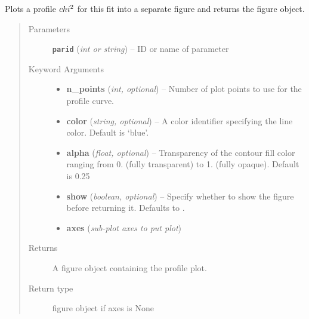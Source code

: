 \documentclass[a4paper,10pt,english]{sphinxmanual}
\begin{document}
\begin{fulllineitems}
\begin{fulllineitems}
\end{fulllineitems}


\begin{fulllineitems}
\label{index:kafe.fit.Fit.plot_profile}
Plots a profile \(\\chi^2\) for this fit into
a separate figure and returns the figure object.
\begin{quote}\begin{description}
\item[{Parameters}] \leavevmode
\textbf{\texttt{parid}} (\emph{int or string}) -- ID or name of parameter

\item[{Keyword Arguments}] \leavevmode\begin{itemize}
\item {} 
\textbf{n\_points} (\emph{int, optional}) --
Number of plot points to use for the profile curve.

\item {} 
\textbf{color} (\emph{string, optional}) --
A  color identifier specifying the line
color. Default is `blue'.

\item {} 
\textbf{alpha} (\emph{float, optional}) --
Transparency of the contour fill color ranging from 0. (fully
transparent) to 1. (fully opaque). Default is 0.25

\item {} 
\textbf{show} (\emph{boolean, optional}) --
Specify whether to show the figure before returning it. Defaults
to .

\item {} 
\textbf{axes} (\emph{sub-plot axes to put plot})

\end{itemize}

\item[{Returns}] \leavevmode
A figure object containing the profile plot.

\item[{Return type}] \leavevmode
{} figure object if axes is None

\end{description}\end{quote}


\end{fulllineitems}
\end{fulllineitems}
\end{document}
